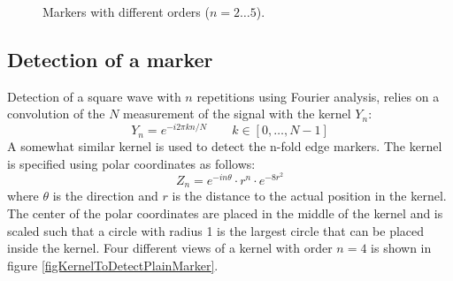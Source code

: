 \documentclass{article}
\begin{document}
\begin{figure}
\newcommand{\steplength}{30}
\newcommand{\archlength}{1.6cm}
\newcommand{\drawarch}[1]{\draw[color=black,fill=black] (2*#1:\archlength) arc(2*#1:2*#1+\steplength:\archlength)
-- (0, 0) -- (2*#1:\archlength); }
\newcommand{\drawdot}{}
\newcommand{\draworder}[1]{\draw (0, -2.2) node {n = #1};}
\renewcommand{\archlength}{1cm}
\caption{Markers with different orders ($n = 2 \ldots 5$).}
\label{figPlainMarkers}
\end{figure}
\subsection{Detection of a marker}
Detection of a square wave with $n$ repetitions using Fourier analysis,
relies on a convolution of the $N$ measurement of the signal with the kernel $Y_n$:
\[
Y_n = e^{-i 2 \pi k n / N} \qquad k \in [0, \ldots, N - 1]
\]
A somewhat similar kernel is used to detect the n-fold edge markers.
The kernel is specified using polar coordinates as follows:
\[
Z_n = e^{-i n \theta} \cdot r^n \cdot e^{-8 r^2}
\]
where $\theta$ is the direction and $r$ is the distance to the actual position in the kernel.
The center of the polar coordinates are placed in the middle of the kernel and
is scaled such that a circle with radius 1 is the largest circle that can be placed inside the kernel.
Four different views of a kernel with order $n = 4$ is shown in
figure \ref{figKernelToDetectPlainMarker}.
\end{document}
